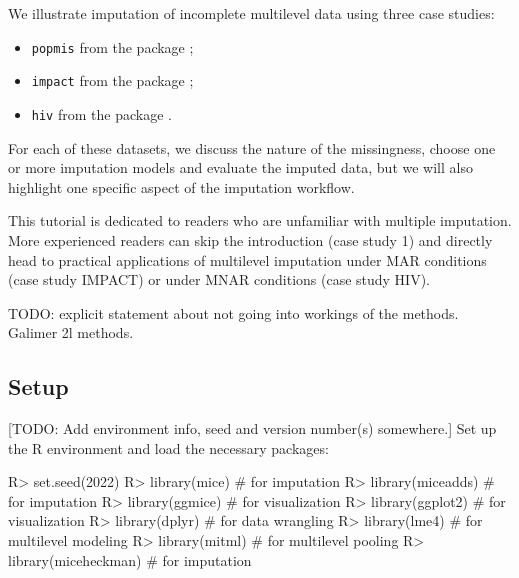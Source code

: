 \documentclass[
]{jss}
\providecommand{\tightlist}{%
  \setlength{\itemsep}{0pt}\setlength{\parskip}{0pt}}
\begin{document}
We illustrate imputation of incomplete multilevel data using three case
studies:

\begin{itemize}
\tightlist
\item
  \texttt{popmis} from the  package \citep[simulated data on
  perceived popularity, \(n = 2,000\) pupils across \(N = 100\) schools
  with data that are MAR,][]{mice};
\item
  \texttt{impact} from the  package \citep[empirical data
  on traumatic brain injuries, \(n = 11,022\) patients across \(N = 15\)
  studies with data that are MAR,][]{metamisc};
\item
  \texttt{hiv} from the  package \citep[simulated data on HIV
  diagnoses, \(n = 6,416\) patients across \(N = 9\) regions with data
  that are MNAR,][]{GJRM}.
\end{itemize}

For each of these datasets, we discuss the nature of the missingness,
choose one or more imputation models and evaluate the imputed data, but
we will also highlight one specific aspect of the imputation workflow.

This tutorial is dedicated to readers who are unfamiliar with multiple
imputation. More experienced readers can skip the introduction (case
study 1) and directly head to practical applications of multilevel
imputation under MAR conditions (case study IMPACT) or under MNAR
conditions (case study HIV).

TODO: explicit statement about not going into workings of the methods.
Galimer 2l methods.

\hypertarget{setup}{%
\subsection{Setup}\label{setup}}

{[}TODO: Add environment info, seed and version number(s) somewhere.{]}
Set up the R environment and load the necessary packages:

\begin{CodeChunk}
\begin{CodeInput}
R> set.seed(2022)
R> library(mice)         # for imputation
R> library(miceadds)     # for imputation
R> library(ggmice)       # for visualization
R> library(ggplot2)      # for visualization
R> library(dplyr)        # for data wrangling
R> library(lme4)         # for multilevel modeling
R> library(mitml)        # for multilevel pooling
R> library(miceheckman)  # for imputation
\end{CodeInput}
\end{CodeChunk}
\end{document}
